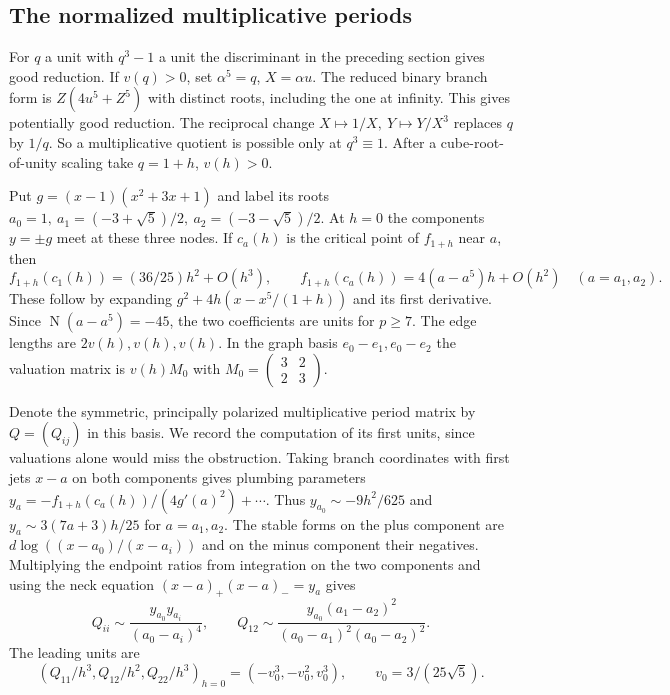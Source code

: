 \documentclass[11pt]{article}
\begin{document}
\subsection{The normalized multiplicative periods}
For $q$ a unit with $q^3-1$ a unit the discriminant in the preceding
section gives good reduction. If $v(q)>0$, set $\alpha^5=q$, $X=\alpha u$.
The reduced binary branch form is $Z(4u^5+Z^5)$ with distinct roots,
including the one at infinity. This gives potentially good reduction.
The reciprocal change $X\mapsto1/X,\ Y\mapsto Y/X^3$ replaces $q$ by
$1/q$. So a multiplicative quotient is possible only at $q^3\equiv1$.
After a cube-root-of-unity scaling take $q=1+h$, $v(h)>0$.

Put $g=(x-1)(x^2+3x+1)$ and label its roots
$a_0=1,\ a_1=(-3+\sqrt5)/2,\ a_2=(-3-\sqrt5)/2$. At $h=0$ the
components $y=\pm g$ meet at these three nodes. If $c_a(h)$ is the
critical point of $f_{1+h}$ near $a$, then
\[
 f_{1+h}(c_1(h))=(36/25)h^2+O(h^3),\qquad
 f_{1+h}(c_a(h))=4(a-a^5)h+O(h^2)\quad(a=a_1,a_2).
\]
These follow by expanding $g^2+4h(x-x^5/(1+h))$ and its first
derivative. Since $\operatorname N(a-a^5)=-45$, the two coefficients
are units for $p\ge7$. The edge lengths are $2v(h),v(h),v(h)$.
In the graph basis $e_0-e_1,e_0-e_2$ the valuation matrix is
$v(h)M_0$ with $M_0=\left(\begin{smallmatrix}3&2\\2&3\end{smallmatrix}\right)$.

Denote the symmetric, principally polarized multiplicative period matrix
by $Q=(Q_{ij})$ in this basis. We record the computation of its first
units, since valuations alone would miss the obstruction. Taking branch
coordinates with first jets $x-a$ on both components gives plumbing
parameters $y_a=-f_{1+h}(c_a(h))/(4g'(a)^2)+\cdots$. Thus
$y_{a_0}\sim-9h^2/625$ and $y_a\sim3(7a+3)h/25$ for $a=a_1,a_2$.
The stable forms on the plus component are
$d\log((x-a_0)/(x-a_i))$ and on the minus component their negatives.
Multiplying the endpoint ratios from integration on the two components
and using the neck equation $(x-a)_+(x-a)_-=y_a$ gives
\[
 Q_{ii}\sim\frac{y_{a_0}y_{a_i}}{(a_0-a_i)^4},\qquad
 Q_{12}\sim\frac{y_{a_0}(a_1-a_2)^2}
                  {(a_0-a_1)^2(a_0-a_2)^2}.
\]
The leading units are
\[ (Q_{11}/h^3,Q_{12}/h^2,Q_{22}/h^3)_{h=0}=(-v_0^3,-v_0^2,v_0^3),\qquad v_0=3/(25\sqrt5). \]
\end{document}
